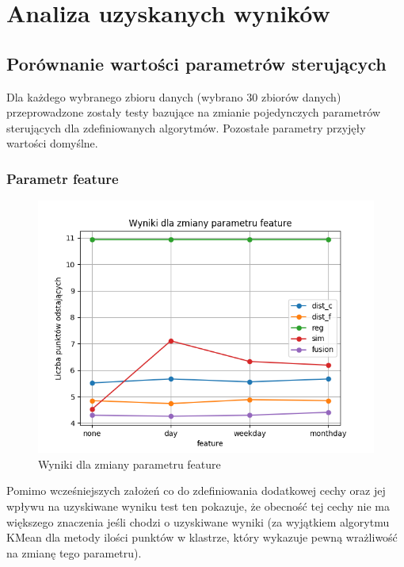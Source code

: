 \documentclass[eng,printmode]{mgr}
\begin{document}
\section{Analiza uzyskanych wyników}
\subsection{Porównanie wartości parametrów sterujących}
Dla każdego wybranego zbioru danych (wybrano 30 zbiorów danych) przeprowadzone zostały testy bazujące na zmianie pojedynczych parametrów sterujących dla zdefiniowanych algorytmów. Pozostałe parametry przyjęły wartości domyślne.
\subsubsection{Parametr feature}
\begin{figure}[H]
  \begin{center}
  \includegraphics[scale=0.7]{avg_feature}
  \end{center}
  \caption{Wyniki dla zmiany parametru feature}
  \label{fig:avg_feature}
\end{figure}
Pomimo wcześniejszych założeń co do zdefiniowania dodatkowej cechy oraz jej wpływu na uzyskiwane wyniku test ten pokazuje, że obecność tej cechy nie ma większego znaczenia jeśli chodzi o uzyskiwane wyniki (za wyjątkiem algorytmu KMean dla metody ilości punktów w klastrze, który wykazuje pewną wrażliwość na zmianę tego parametru).
\end{document}
